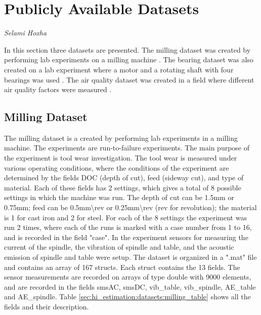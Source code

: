 
\newpage
\section{Publicly Available Datasets}
\vspace*{-15mm}
\hfill{\normalsize\emph{Selami Hoxha}}
\label{sec:hi_estimation:datasets}

In this section three datasets are presented. The milling dataset was created by performing lab experiments on
a milling machine \cite{millingData}. The bearing dataset was also created on a lab experiment where a motor
and a rotating shaft with four bearings was used \cite{bearingData}. The air quality dataset was created in a
field where different air quality factors were measured \cite{airQualityData}.

\subsection{Milling Dataset}
\label{sec:hi_estimation:datasets:milling_dataset}

The milling dataset \cite{millingData} is a created by performing lab experiments in a milling machine. The
experiments are run-to-failure experiments. The main purpose of the experiment is tool wear investigation. The
tool wear is measured under various operating conditions, where the conditions of the experiment are determined
by the fields DOC (depth of cut), feed (sideway cut), and type of material. Each of these fields has 2 settings,
which gives a total of 8 possible settings in which the machine was run. The depth of cut can be 1.5mm or
0.75mm; feed can be 0.5mm\textbackslash rev or 0.25mm\textbackslash rev (rev for revolution); the material is 1
for cast iron and 2 for steel. For each of the 8 settings the experiment was run 2 times, where each of the runs
is marked with a case number from 1 to 16, and is recorded in the field "case". In the experiment sensors for
measuring the current of the spindle, the vibration of spindle and table, and the acoustic emission of spindle and table
were setup. The dataset is organized in a ".mat" file and contains an array of 167 structs. Each struct contains
the 13 fields. The sensor measurements are recorded on arrays of type double with 9000 elements, and are recorded
in the fields smsAC, smsDC, vib\_table, vib\_spindle, AE\_table and AE\_spindle. Table
\ref{sec:hi_estimation:datasets:milling_table} shows all the fields and their description.

